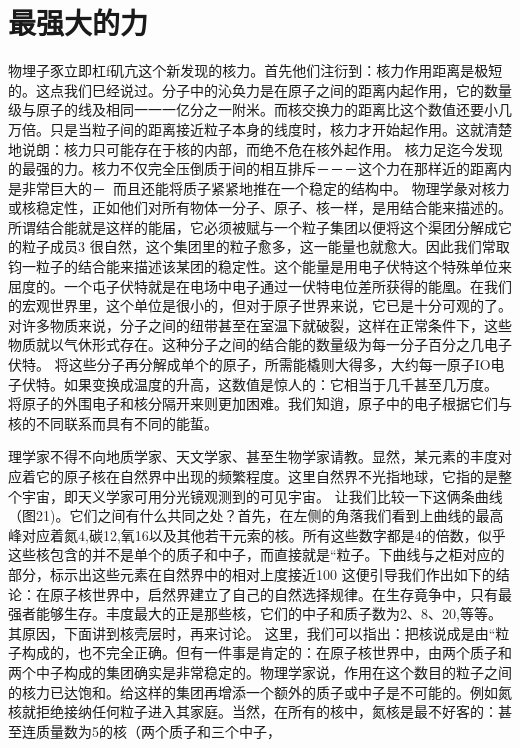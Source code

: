 \section{最强大的力}

物埋子豕立即杠f矶亢这个新发现的核力。首先他们注衍到：核力作用距离是极短的。这点我们巳经说过。分子中的沁奂力是在原子之间的距离内起作用，它的数量级与原子的线及相同一一一亿分之一附米。而核交换力的距离比这个数值还要小几万倍。只是当粒子间的距离接近粒子本身的线度时，核力才开始起作用。这就清楚地说朗：核力只可能存在于核的内部，而绝不危在核外起作用。
核力足迄今发现的最强的力。核力不仅完全压倒质于间的相互排斥－－－这个力在那样近的距离内是非常巨大的－~而且还能将质子紧紧地推在一个稳定的结构中。
物理学彖对核力或核稳定性，正如他们对所有物体一分子、原子、核一样，是用结合能来描述的。所谓结合能就是这样的能届，它必须被赋与一个粒子集团以便将这个渠团分解成它的粒子成员3
很自然，这个集团里的粒子愈多，这一能量也就愈大。因此我们常取钧一粒子的结合能来描述该某团的稳定性。这个能量是用电子伏特这个特殊单位来屈度的。一个屯子伏特就是在电场中电子通过一伏特电位差所获得的能凰。在我们的宏观世界里，这个单位是很小的，但对于原子世界来说，它已是十分可观的了。
对许多物质来说，分子之间的纽带甚至在室温下就破裂，这样在正常条件下，这些物质就以气休形式存在。这种分子之间的结合能的数量级为每一分子百分之几电子伏特。
将这些分子再分解成单个的原子，所需能橇则大得多，大约每一原子IO电子伏特。如果变换成温度的升高，这数值是惊人的：它相当于几千甚至几万度。
将原子的外围电子和核分隔开来则更加困难。我们知逍，原子中的电子根据它们与核的不同联系而具有不同的能蜇。

理学家不得不向地质学家、天文学家、甚至生物学家请教。显然，某元素的丰度对应着它的原子核在自然界中出现的频繁程度。这里自然界不光指地球，它指的是整个宇宙，即天义学家可用分光镜观测到的可见宇宙。
让我们比较一下这俩条曲线（图21)。它们之间有什么共同之处？首先，在左侧的角落我们看到上曲线的最高峰对应着氮4,碳12,氧16以及其他若干元索的核。所有这些数字都是4的倍数，似乎这些核包含的并不是单个的质子和中子，而直接就是“粒子。下曲线与之柜对应的部分，标示出这些元素在自然界中的相对上度接近100%
这便引导我们作出如下的结论：在原子核世界中，启然界建立了自己的自然选择规律。在生存竟争中，只有最强者能够生存。丰度最大的正是那些核，它们的中子和质子数为2、8、20,等等。其原因，下面讲到核壳层时，再来讨论。
这里，我们可以指出：把核说成是由“粒子构成的，也不完全正确。但有一件事是肯定的：在原子核世界中，由两个质子和两个中子构成的集团确实是非常稳定的。物理学家说，作用在这个数目的粒子之间的核力已达饱和。给这样的集团再增添一个额外的质子或中子是不可能的。例如氮核就拒绝接纳任何粒子进入其家庭。当然，在所有的核中，氮核是最不好客的：甚至连质量数为5的核（两个质子和三个中子，

